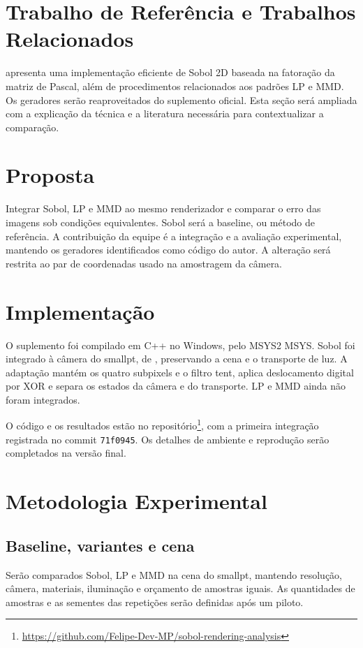 \documentclass[9pt,a4paper,twocolumn]{extarticle}
\begin{document}
\section{Trabalho de Referência e Trabalhos Relacionados}
\textcite{ahmed2024} apresenta uma implementação eficiente de Sobol 2D baseada na fatoração da matriz de Pascal, além de procedimentos relacionados aos padrões LP e MMD. Os geradores serão reaproveitados do suplemento oficial. Esta seção será ampliada com a explicação da técnica e a literatura necessária para contextualizar a comparação.

\section{Proposta}
Integrar Sobol, LP e MMD ao mesmo renderizador e comparar o erro das imagens sob condições equivalentes. Sobol será a baseline, ou método de referência. A contribuição da equipe é a integração e a avaliação experimental, mantendo os geradores identificados como código do autor. A alteração será restrita ao par de coordenadas usado na amostragem da câmera.

\section{Implementação}
O suplemento foi compilado em C++ no Windows, pelo MSYS2 MSYS. Sobol foi integrado à câmera do smallpt, de \textcite{smallpt}, preservando a cena e o transporte de luz. A adaptação mantém os quatro subpixels e o filtro tent, aplica deslocamento digital por XOR e separa os estados da câmera e do transporte. LP e MMD ainda não foram integrados.

O código e os resultados estão no repositório\footnote{\url{https://github.com/Felipe-Dev-MP/sobol-rendering-analysis}}, com a primeira integração registrada no commit \texttt{71f0945}. Os detalhes de ambiente e reprodução serão completados na versão final.

\section{Metodologia Experimental}
\subsection{Baseline, variantes e cena}
Serão comparados Sobol, LP e MMD na cena do smallpt, mantendo resolução, câmera, materiais, iluminação e orçamento de amostras iguais. As quantidades de amostras e as sementes das repetições serão definidas após um piloto.
\end{document}
